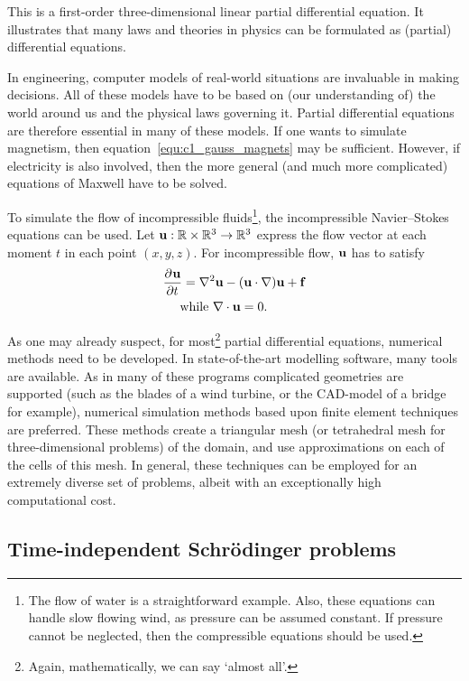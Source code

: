 This is a first-order three-dimensional linear partial differential equation. It illustrates that many laws and theories in physics can be formulated as (partial) differential equations.

In engineering, computer models of real-world situations are invaluable in making decisions. All of these models have to be based on (our understanding of) the world around us and the physical laws governing it. Partial differential equations are therefore essential in many of these models. If one wants to simulate magnetism, then equation~\eqref{equ:c1_gauss_magnets} may be sufficient. However, if electricity is also involved, then the more general (and much more complicated) equations of Maxwell have to be solved.


To simulate the flow of incompressible fluids\footnote{The flow of water is a straightforward example. Also, these equations can handle slow flowing wind, as pressure can be assumed constant. If pressure cannot be neglected, then the compressible equations should be used.}, the incompressible Navier--Stokes equations can be used. Let $\vb{u} : \mathbb{R} \times \mathbb{R}^3 \to \mathbb{R}^3$ express the flow vector at each moment $t$ in each point $(x, y, z)$. For incompressible flow, $\vb{u}$ has to satisfy
\begin{align*}
    & \pdv[]{\vb{u}}{t} = \nabla^2\vb{u} - (\vb{u}\cdot \nabla)\vb{u} + \vb{f} \\
    &\quad\text{ while }\nabla\cdot \vb{u} = 0\text{.}
\end{align*}

As one may already suspect, for most\footnote{Again, mathematically, we can say `almost all'.} partial differential equations, numerical methods need to be developed. In state-of-the-art modelling software, many tools are available. As in many of these programs complicated geometries are supported (such as the blades of a wind turbine, or the CAD-model of a bridge for example), numerical simulation methods based upon finite element techniques are preferred. These methods create a triangular mesh (or tetrahedral mesh for three-dimensional problems) of the domain, and use approximations on each of the cells of this mesh. In general, these techniques can be employed for an extremely diverse set of problems, albeit with an exceptionally high computational cost.

\subsection{Time-independent Schrödinger problems}

